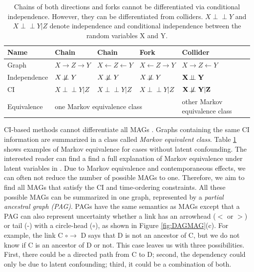 \documentclass[conference]{IEEEtran}
\begin{document}
\begin{table}[htbp] 
\begin{center}
    \caption{Chains of both directions and forks cannot be differentiated via conditional independence. However, they can be differentiated from colliders. $X\!\perp\!\!\!\perp Y$ and $X\!\perp\!\!\!\perp Y|Z$ denote independence and conditional independence between the random variables X and Y.}
\begin{tabular}{@{}l|lll|l@{}}
\toprule
Name         & Chain   & Chain   & Fork    & Collider \\ \midrule
    Graph & $X\rightarrow Z \rightarrow Y$ & $X\leftarrow Z \leftarrow Y$ & $X\leftarrow Z \rightarrow Y$ & $X\rightarrow Z \leftarrow Y$ \\
    Independence & $X\not\!\perp\!\!\!\perp Y$    & $X\not\!\perp\!\!\!\perp Y$    & $X\not\!\perp\!\!\!\perp Y$   & $ \bf{X\!\perp\!\!\!\perp Y}  $       \\
    CI           & $X\!\perp\!\!\!\perp Y|Z$   & $X\!\perp\!\!\!\perp Y|Z$   & $X\!\perp\!\!\!\perp Y|Z$  & $\bf{X\not\!\perp\!\!\!\perp Y|Z}$      \\
    Equivalence & \multicolumn{3}{l|}{one Markov equivalence class} & other Markov equivalence class \\ \bottomrule
\end{tabular}
        \label{tab:equiq}
\end{center}
\end{table}
CI-based methods cannot differentiate all MAGs \cite{richardson_ancestral_2002}. Graphs  containing the same CI information are summarized in a class called \textit{Markov equivalent class}. Table \ref{tab:equiq} shows examples of Markov equivalence for cases without latent confounding. The interested reader can find a find a full explanation of Markov equivalence under latent variables in \cite[section 3.6]{richardson_ancestral_2002}. 
Due to Markov equivalence and contemporaneous effects, we can often not reduce the number of possible MAGs to one. Therefore, we aim to find all MAGs that satisfy the CI and time-ordering constraints. All these possible MAGs can be summarized in one graph, represented by a \textit{partial ancestral graph (PAG)}\cite{zhang_causal_2008}.
PAGs have the same semantics as MAGs except that a PAG can also represent uncertainty whether a link has an arrowhead ($<$ or $>$) or tail (-) with a circle-head ($\circ$), as shown in Figure \ref{fig:DAGMAG}(c). For example, the link C $\circ$$\rightarrow$ D says that D is not an ancestor of C, but we do not know if C is an ancestor of D or not. 
This case leaves us with three possibilities. First, there could be a directed path from C to D; second, the dependency could only be due to latent confounding; third, it could be a combination of both. 
\end{document}
